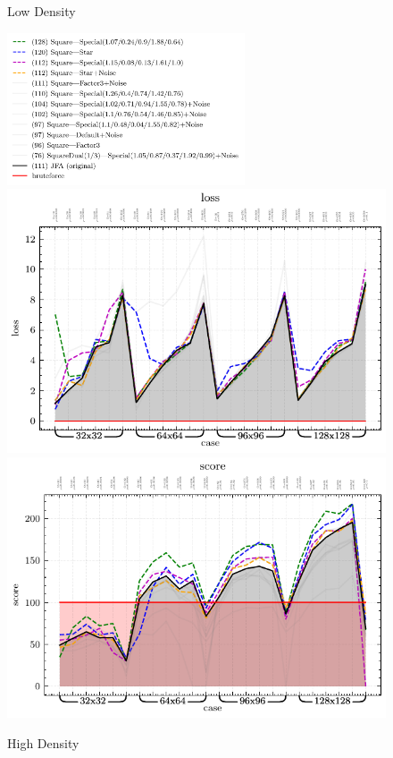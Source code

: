 \documentclass[format=acmsmall,screen,review,authordraft,nonacm]{acmart}
\begin{document}
\begin{figure}[H]
\begin{minipage}{0.48\textwidth}
		\caption{Low Density}
		\label{Fig:noise}
	\end{minipage}\hfill
	\begin{minipage}{0.48\textwidth}
		\centering
		\includegraphics[height=4.5cm]{../figures/results-small-high/legend}
		\includegraphics[width=1\linewidth]{../figures/results-small-high/figure-2-loss}
		\includegraphics[width=1\linewidth]{../figures/results-small-high/figure-3-score}
		\caption{High Density}
		\label{Fig:lnoise}
	\end{minipage}
	\label{Small Shape: 32x32, 64x64, 96x96, 128x128}
\end{figure}
\end{document}
